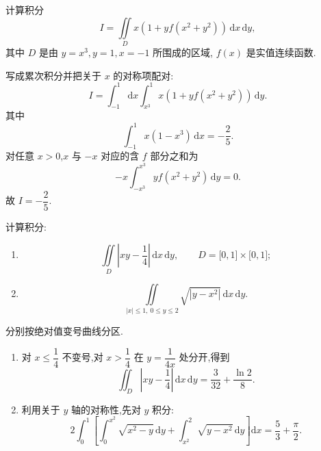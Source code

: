 \begin{example}
    计算积分
    \[
        I=\iint\limits_Dx\left(1+yf(x^2+y^2)\right)\,\mathrm{d}x\,\mathrm{d}y,
    \]
    其中 $D$ 是由 $y=x^3,y=1,x=-1$ 所围成的区域, $f(x)$ 是实值连续函数.
\end{example}
\exampleblank

\begin{solution}
    写成累次积分并把关于 $x$ 的对称项配对:
    \[
        I=\int_{-1}^1\!\mathrm{d}x\int_{x^3}^1x\left(1+yf(x^2+y^2)\right)\,\mathrm{d}y.
    \]
    其中
    \[
        \displaystyle\int_{-1}^1x(1-x^3)\,\mathrm{d}x=-\dfrac{2}{5}.
    \]
    对任意 $x>0$,$x$ 与 $-x$ 对应的含 $f$ 部分之和为
    \[
        -x\int_{-x^3}^{x^3}y f(x^2+y^2)\,\mathrm{d}y=0.
    \]
    故 $I=-\dfrac{2}{5}$.
\end{solution}

\begin{example}
    计算积分:
    \begin{enumerate}
        \item
              \[
                  \displaystyle\iint\limits_D\left|xy-\dfrac{1}{4}\right|\,\mathrm{d}x\,\mathrm{d}y,
                  \qquad D=\lbrack0,1\rbrack\times\lbrack0,1\rbrack;
              \]
        \item
              \[
                  \displaystyle\iint\limits_{|x|\leq1,\ 0\leq y\leq2}\sqrt{|y-x^2|}\,\mathrm{d}x\,\mathrm{d}y.
              \]
    \end{enumerate}
\end{example}
\exampleblank

\begin{solution}
    分别按绝对值变号曲线分区.
    \begin{enumerate}
        \item 对 $x\leq\dfrac{1}{4}$ 不变号,对 $x>\dfrac{1}{4}$ 在 $y=\dfrac{1}{4x}$ 处分开,得到
              \[
                  \displaystyle\iint_D\left|xy-\dfrac{1}{4}\right|\,\mathrm{d}x\,\mathrm{d}y
                  =\dfrac{3}{32}+\dfrac{\ln2}{8}.
              \]
        \item 利用关于 $y$ 轴的对称性,先对 $y$ 积分:
              \[
                  2\int_0^1\left[\int_0^{x^2}\sqrt{x^2-y}\,\mathrm{d}y
                      +\int_{x^2}^2\sqrt{y-x^2}\,\mathrm{d}y\right]\mathrm{d}x
                  =\dfrac{5}{3}+\dfrac{\pi}{2}.
              \]
    \end{enumerate}
\end{solution}

